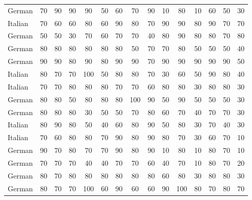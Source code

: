 \begin{table}[htbp]
\begin{tabular}{lcccccccccccccc}
German & 70 & 90 & 90 & 90 & 50 & 60 & 70 & 90 & 10 & 80 & 10 & 60 & 50 & 30 \\
Italian & 70 & 60 & 60 & 80 & 60 & 90 & 80 & 70 & 90 & 90 & 80 & 90 & 70 & 70 \\
German & 50 & 50 & 30 & 70 & 60 & 70 & 70 & 40 & 80 & 90 & 80 & 80 & 70 & 80 \\
German & 80 & 80 & 80 & 80 & 80 & 80 & 50 & 70 & 70 & 80 & 50 & 50 & 50 & 40 \\
German & 90 & 90 & 80 & 90 & 80 & 90 & 90 & 70 & 90 & 90 & 90 & 90 & 90 & 50 \\
Italian & 80 & 70 & 70 & 100 & 50 & 80 & 80 & 70 & 30 & 60 & 50 & 90 & 80 & 40 \\
Italian & 70 & 70 & 80 & 80 & 80 & 70 & 70 & 60 & 80 & 80 & 30 & 80 & 80 & 30 \\
German & 80 & 80 & 50 & 80 & 80 & 80 & 100 & 90 & 50 & 90 & 50 & 50 & 50 & 30 \\
German & 80 & 80 & 80 & 30 & 50 & 50 & 70 & 80 & 60 & 70 & 40 & 70 & 70 & 30 \\
Italian & 80 & 90 & 80 & 50 & 40 & 60 & 80 & 90 & 50 & 80 & 30 & 70 & 40 & 30 \\
Italian & 70 & 60 & 80 & 80 & 70 & 90 & 80 & 90 & 80 & 70 & 30 & 60 & 70 & 10 \\
German & 90 & 70 & 80 & 70 & 70 & 90 & 80 & 90 & 10 & 80 & 10 & 80 & 70 & 10 \\
German & 70 & 70 & 70 & 40 & 40 & 70 & 70 & 60 & 40 & 70 & 10 & 80 & 70 & 20 \\
German & 80 & 70 & 80 & 80 & 80 & 80 & 80 & 80 & 60 & 80 & 30 & 80 & 80 & 30 \\
German & 80 & 70 & 70 & 100 & 60 & 90 & 60 & 60 & 90 & 100 & 80 & 70 & 80 & 70 \\
\bottomrule
\end{tabular}
\end{table}
